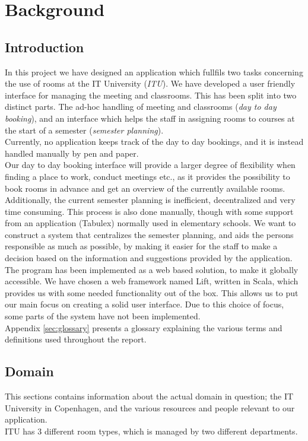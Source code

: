 \chapter{Background}
\section{Introduction}
In this project we have designed an application which fullfils two tasks concerning the use of rooms at the IT University (\emph{ITU}). We have developed a user friendly interface for managing the meeting and classrooms. This has been split into two distinct parts. The ad-hoc handling of meeting and classrooms (\emph{day to day booking}), and an interface which helps the staff in assigning rooms to courses at the start of a semester (\emph{semester planning}).\\

Currently, no application keeps track of the day to day bookings, and it is instead handled manually by pen and paper.\\
Our day to day booking interface will provide a larger degree of flexibility when finding a place to work, conduct meetings etc., as it provides the possibility to book rooms in advance and get an overview of the currently available rooms.\\

Additionally, the current semester planning is inefficient, decentralized and very time consuming. This process is also done manually, though with some support from an application (Tabulex\cite{tabulex}) normally used in elementary schools.
We want to construct a system that centralizes the semester planning, and aids the persons responsible as much as possible, by making it easier for the staff to make a decision based on the information and suggestions provided by the application. \\

The program has been implemented as a web based solution, to make it globally accessible. We have chosen a web framework named Lift, written in Scala, which provides us with some needed functionality out of the box. This allows us to put our main focus on creating a solid user interface. Due to this choice of focus, some parts of the system have not been implemented.\\

Appendix \ref{sec:glossary} presents a glossary explaining the various terms and definitions used throughout the report.

\pagebreak
\section{Domain}
\label{sec:domain}
This sections contains information about the actual domain in question; the IT University in Copenhagen, and the various resources and people relevant to our application. \\
ITU has 3 different room types, which is managed by two different departments.

